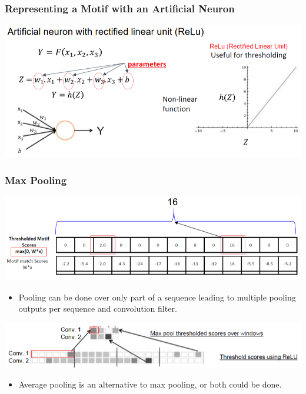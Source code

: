 \documentclass[10pt]{article}
\begin{document}
\subsubsection*{Representing a Motif with an Artificial Neuron}
\begin{center} 
	\includegraphics*[width=\textwidth]{W8_17.png} 
\end{center}

\subsubsection*{Max Pooling}
\begin{center} 
	\includegraphics*[width=\textwidth]{W8_18.png} 
\end{center}
\begin{itemize}
	\item Pooling can be done over only part of a sequence leading to multiple pooling outputs per sequence and convolution filter.
\end{itemize}
\begin{center} 
	\includegraphics*[width=\textwidth]{W8_19.png} 
\end{center}
\begin{itemize}
	\item Average pooling is an alternative to max pooling, or both could be done.
\end{itemize}
\end{document}
